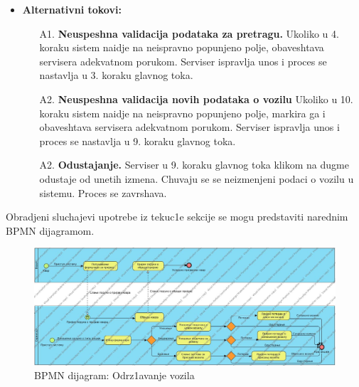 \begin{itemize}
{}
\item{\textbf{Alternativni tokovi:} 
\begin{enumerate}
    \item [A1.] \textbf{Neuspeshna validacija podataka za pretragu.} Ukoliko u 4. koraku sistem naidje na neispravno popunjeno polje, obaveshtava servisera adekvatnom porukom. Serviser ispravlja unos i proces se nastavlja u 3. koraku glavnog toka.
    \item [A2.] \textbf{Neuspeshna validacija novih podataka o vozilu} Ukoliko u 10. koraku sistem naidje na neispravno popunjeno polje, markira ga i obaveshtava servisera adekvatnom porukom. Serviser ispravlja unos i proces se nastavlja u 9. koraku glavnog toka.
    \item[A2.] \textbf{Odustajanje.} Serviser u 9. koraku glavnog toka klikom na dugme odustaje od unetih izmena. Chuvaju se se neizmenjeni podaci o vozilu u sistemu. Proces se zavrshava.
\end{enumerate}
}
\end{itemize}


Obradjeni sluchajevi upotrebe iz tekuc1e sekcije se mogu predstaviti narednim BPMN dijagramom.
\newpage

\begin{figure}[h!]
    \includegraphics[angle = 90, scale = 0.35]{Slike/BPMNodrzavanje.jpg}
    \centering
    \caption{BPMN dijagram: Odrz1avanje vozila}
    \label{BPMN odrzavanje}
\end{figure}  
